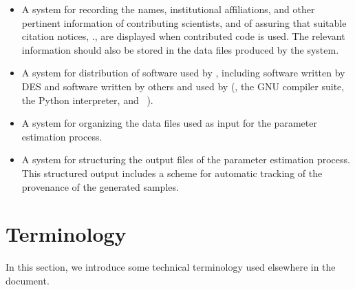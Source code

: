 \documentclass[draftmode,draftwater]{memarticle}
\newcommand{\cosmosis}{\name{CosmoSIS}\xspace}
\begin{document}
\begin{itemize}
\item A system for recording the names, institutional affiliations, and
  other pertinent information of contributing scientists, and of
  assuring that suitable citation notices, \etc., are displayed when
  contributed code is used. The relevant information should also be
  stored in the data files produced by the system.

\item A system for distribution of software used by \cosmosis, including
  software written by DES and software written by others and used by
  \cosmosis (\eg, the GNU compiler suite, the Python interpreter, and
  ~\cite{numpy}).

\item A system for organizing the data files used as input for the
  parameter estimation process.

\item A system for structuring the output files of the parameter
  estimation process. This structured output includes a scheme for
  automatic tracking of the provenance of the generated samples.

\end{itemize}


\section{Terminology\label{sec:terminology}}

In this section, we introduce some technical terminology used elsewhere
in the document.
\end{document}
